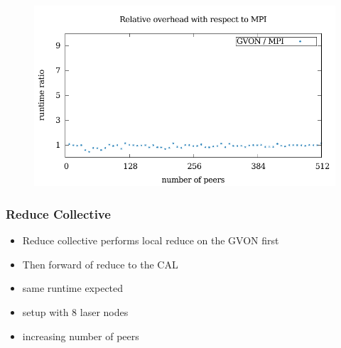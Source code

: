 \begin{figure}[H]
\begin{minipage}[t]{0.5\textwidth}
    \includegraphics[width=\textwidth]{plots/50_collective_network_overhead_gvon_laser}
  \end{minipage}%
  \caption{ }
  \label{fig:collective_npeers}
\end{figure}


\subsubsection*{Reduce Collective}
\begin{itemize}
  \item Reduce collective performs local reduce on the GVON first
  \item Then forward of reduce to the CAL
  \item same runtime expected
  \item setup with 8 laser nodes
  \item increasing number of peers 
\end{itemize}

